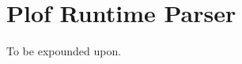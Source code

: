 \part{Plof Runtime Parser}

To be expounded upon.


\begin{comment}
\subsection{Runtime Grammar Definitions}

There are several PSL operations which can only be run while in an \textit{immediate} block, and affect the runtime parser itself. They are:



<table border="0" cellspacing="0" cellpadding="0" class="Table2"><colgroup><col width="49"/><col width="115"/><col width="604"/></colgroup><tr><td style="text-align:left;width:0.4444in; " class="Table2_A1"><p class="P22">Hex

</td><td style="text-align:left;width:1.0354in; " class="Table2_B1"><p class="P22">Name

</td><td style="text-align:left;width:5.4451in; " class="Table2_B1"><p class="P22">Function

</td></tr><tr><td style="text-align:left;width:0.4444in; " class="Table2_A2"><p class="P21">

</td><td style="text-align:left;width:1.0354in; " class="Table2_B2"><p class="P21">

</td><td style="text-align:left;width:5.4451in; " class="Table2_B2"><p class="P21">Operations F0-F5 do not affect the grammar immediately, the changes must be committed with \textit{gcommit}.

</td></tr><tr><td style="text-align:left;width:0.4444in; " class="Table2_A1"><p class="P21">F0

</td><td style="text-align:left;width:1.0354in; " class="Table2_B1"><p class="P21">gadd

</td><td style="text-align:left;width:5.4451in; " class="Table2_B1"><p class="P21">Add a production to the grammar. Pops the production name, the production itself, and the associated PSL code. The production itself is an array of strings (as raw data), each of which is either:

<ul><li><p class="P32" style="margin-left:0.635cm;"><span class="Bullet_20_Symbols" style="display:block;float:left;min-width:0.635cm;">•.</span>The name of another production, or<span class="odfLiEnd"/>


\end{comment}
